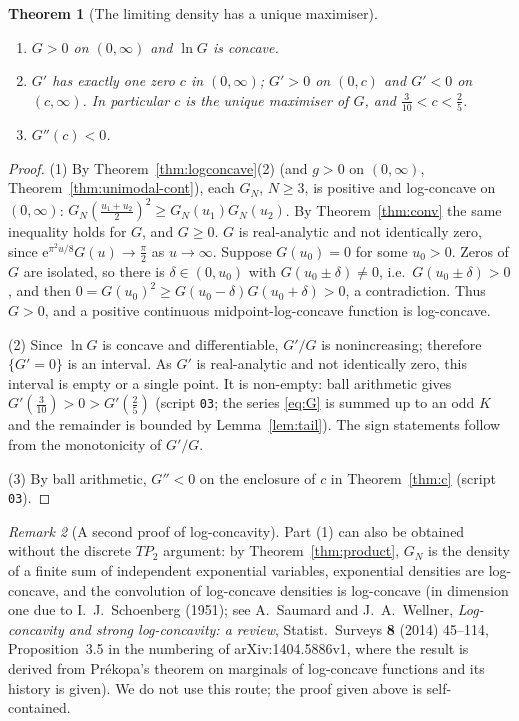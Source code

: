 \documentclass[11pt,a4paper]{article}
\newtheorem{theorem}{Theorem}[section]
\theoremstyle{definition}
\theoremstyle{remark}
\newtheorem{remark}[theorem]{Remark}
\newcommand{\ee}{\mathrm{e}}
\begin{document}
\begin{theorem}[The limiting density has a unique maximiser]\label{thm:Gunique}
\begin{enumerate}
\item $G>0$ on $(0,\infty)$ and $\ln G$ is concave.
\item $G'$ has exactly one zero $c$ in $(0,\infty)$; $G'>0$ on $(0,c)$ and $G'<0$ on $(c,\infty)$. In particular $c$
is the unique maximiser of $G$, and $\tfrac3{10}<c<\tfrac25$.
\item $G''(c)<0$.
\end{enumerate}
\end{theorem}
\begin{proof}
(1) By Theorem~\ref{thm:logconcave}(2) (and $g>0$ on $(0,\infty)$, Theorem~\ref{thm:unimodal-cont}), each
$G_N$, $N\ge3$, is positive and log-concave on $(0,\infty)$:
$G_N(\frac{u_1+u_2}2)^2\ge G_N(u_1)G_N(u_2)$. By Theorem~\ref{thm:conv} the same inequality holds for $G$, and $G\ge0$.
$G$ is real-analytic and not identically zero, since $\ee^{\pi^2u/8}G(u)\to\frac\pi2$ as $u\to\infty$. Suppose
$G(u_0)=0$ for some $u_0>0$. Zeros of $G$ are isolated, so there is $\delta\in(0,u_0)$ with $G(u_0\pm\delta)\ne0$,
i.e.\ $G(u_0\pm\delta)>0$, and then $0=G(u_0)^2\ge G(u_0-\delta)G(u_0+\delta)>0$, a contradiction. Thus $G>0$, and
a positive continuous midpoint-log-concave function is log-concave.

(2) Since $\ln G$ is concave and differentiable, $G'/G$ is nonincreasing; therefore $\{G'=0\}$ is an interval.
As $G'$ is real-analytic and not identically zero, this interval is empty or a single point. It is non-empty:
ball arithmetic gives $G'(\tfrac3{10})>0>G'(\tfrac25)$ (script \texttt{03}; the series \eqref{eq:G} is summed up to
an odd $K$ and the remainder is bounded by Lemma~\ref{lem:tail}). The sign statements follow from the
monotonicity of $G'/G$.

(3) By ball arithmetic, $G''<0$ on the enclosure of $c$ in Theorem~\ref{thm:c} (script \texttt{03}).
\end{proof}

\begin{remark}[A second proof of log-concavity]\label{rem:prekopa}
Part (1) can also be obtained without the discrete $TP_2$ argument: by Theorem~\ref{thm:product}, $G_N$ is the density
of a finite sum of independent exponential variables, exponential densities are log-concave, and the convolution of
log-concave densities is log-concave (in dimension one due to I.~J.~Schoenberg (1951); see A.~Saumard and
J.~A.~Wellner, \emph{Log-concavity and strong log-concavity: a review}, Statist.\ Surveys \textbf{8} (2014) 45--114,
Proposition~3.5 in the numbering of arXiv:1404.5886v1, where the result is derived from Pr\'ekopa's theorem on
marginals of log-concave functions and its history is given). We do not use this route; the proof given above is
self-contained.
\end{remark}
\end{document}
